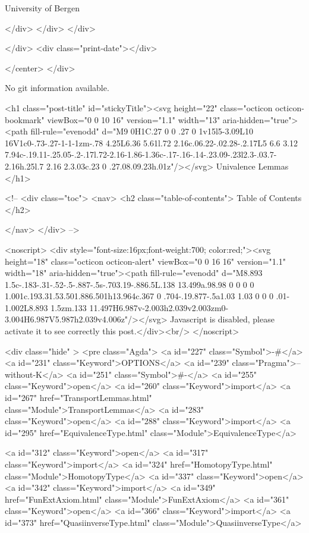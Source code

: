                   University of Bergen
                
                </div>
            </div>
          </div>
          
          
        </div>
        <div class="print-date"></div>
        
        
    </center>
  </div>

  
  No git information available.
  
  <h1 class="post-title" id="stickyTitle"><svg height="22" class="octicon octicon-bookmark" viewBox="0 0 10 16" version="1.1" width="13" aria-hidden="true"><path fill-rule="evenodd" d="M9 0H1C.27 0 0 .27 0 1v15l5-3.09L10 16V1c0-.73-.27-1-1-1zm-.78 4.25L6.36 5.61l.72 2.16c.06.22-.02.28-.2.17L5 6.6 3.12 7.94c-.19.11-.25.05-.2-.17l.72-2.16-1.86-1.36c-.17-.16-.14-.23.09-.23l2.3-.03.7-2.16h.25l.7 2.16 2.3.03c.23 0 .27.08.09.23h.01z"/></svg> Univalence Lemmas
  </h1>

  <!-- 
  <div class="toc">
    <nav>
    <h2 class="table-of-contents"> Table of Contents </h2>
      

    </nav>
  </div>
   -->

  <noscript>
  <div style="font-size:16px;font-weight:700; color:red;"><svg height="18" class="octicon octicon-alert" viewBox="0 0 16 16" version="1.1" width="18" aria-hidden="true"><path fill-rule="evenodd" d="M8.893 1.5c-.183-.31-.52-.5-.887-.5s-.703.19-.886.5L.138 13.499a.98.98 0 0 0 0 1.001c.193.31.53.501.886.501h13.964c.367 0 .704-.19.877-.5a1.03 1.03 0 0 0 .01-1.002L8.893 1.5zm.133 11.497H6.987v-2.003h2.039v2.003zm0-3.004H6.987V5.987h2.039v4.006z"/></svg> Javascript is disabled, please activate it to see correctly this post.</div><br/>
  </noscript>

  <div class="hide" >
<pre class="Agda">
<a id="227" class="Symbol">{-#</a> <a id="231" class="Keyword">OPTIONS</a> <a id="239" class="Pragma">--without-K</a> <a id="251" class="Symbol">#-}</a>
<a id="255" class="Keyword">open</a> <a id="260" class="Keyword">import</a> <a id="267" href="TransportLemmas.html" class="Module">TransportLemmas</a>
<a id="283" class="Keyword">open</a> <a id="288" class="Keyword">import</a> <a id="295" href="EquivalenceType.html" class="Module">EquivalenceType</a>

<a id="312" class="Keyword">open</a> <a id="317" class="Keyword">import</a> <a id="324" href="HomotopyType.html" class="Module">HomotopyType</a>
<a id="337" class="Keyword">open</a> <a id="342" class="Keyword">import</a> <a id="349" href="FunExtAxiom.html" class="Module">FunExtAxiom</a>
<a id="361" class="Keyword">open</a> <a id="366" class="Keyword">import</a> <a id="373" href="QuasiinverseType.html" class="Module">QuasiinverseType</a>

